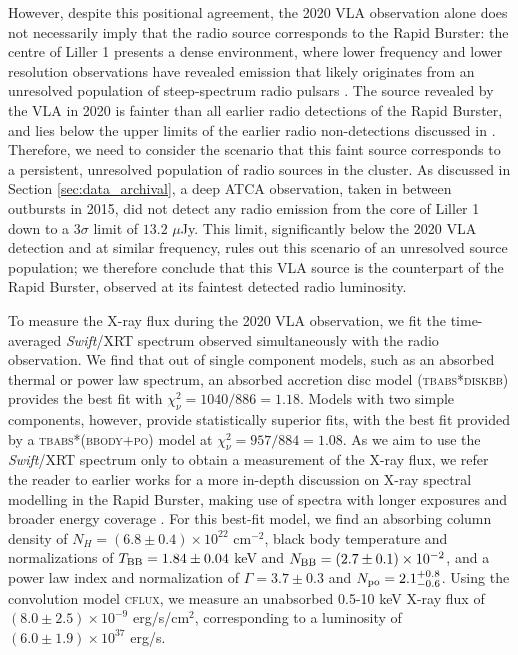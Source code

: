 \documentclass[fleqn,usenatbib]{mnras}
\begin{document}
However, despite this positional agreement, the 2020 VLA observation alone does not necessarily imply that the radio source corresponds to the Rapid Burster: the centre of Liller 1 presents a dense environment, where lower frequency and lower resolution observations have revealed emission that likely originates from an unresolved population of steep-spectrum radio pulsars \citep{fruchter1995}. The source revealed by the VLA in 2020 is fainter than all earlier radio detections of the Rapid Burster, and lies below the upper limits of the earlier radio non-detections discussed in \citet{moore2000}. Therefore, we need to consider the scenario that this faint source corresponds to a persistent, unresolved population of radio sources in the cluster. As discussed in Section \ref{sec:data_archival}, a deep ATCA observation, taken in between outbursts in 2015, did not detect any radio emission from the core of Liller 1 down to a $3\sigma$ limit of $13.2$ $\mu$Jy. This limit, significantly below the 2020 VLA detection and at similar frequency, rules out this scenario of an unresolved source population; we therefore conclude that this VLA source is the counterpart of the Rapid Burster, observed at its faintest detected radio luminosity.  

\label{sec:xrayanalysis} 
To measure the X-ray flux during the 2020 VLA observation, we fit the time-averaged \textit{Swift}/XRT spectrum observed simultaneously with the radio observation. We find that out of single component models, such as an absorbed thermal or power law spectrum, an absorbed accretion disc model (\textsc{tbabs*diskbb}) provides the best fit with $\chi^2_\nu = 1040/886 = 1.18$. Models with two simple components, however, provide statistically superior fits, with the best fit provided by a \textsc{tbabs*(bbody+po)} model at $\chi^2_\nu = 957/884 = 1.08$. As we aim to use the \textit{Swift}/XRT spectrum only to obtain a measurement of the X-ray flux, we refer the reader to earlier works for a more in-depth discussion on X-ray spectral modelling in the Rapid Burster, making use of spectra with longer exposures and broader energy coverage \citep[see e.g.][and references therein]{vandeneijnden2017}. For this best-fit model, we find an absorbing column density of $N_H = (6.8\pm0.4)\times10^{22}$ cm$^{-2}$, black body temperature and normalizations of $T_{\rm BB} = 1.84\pm0.04$ keV and $N_{\rm BB} = (2.7\pm0.1)\times10^{-2}$, and a power law index and normalization of $\Gamma = 3.7 \pm 0.3$ and $N_{\rm po} = 2.1^{+0.8}_{-0.6}$. Using the convolution model \textsc{cflux}, we measure an unabsorbed 0.5-10 keV X-ray flux of $(8.0\pm2.5)\times10^{-9}$ erg/s/cm$^2$, corresponding to a luminosity of $(6.0 \pm 1.9)\times10^{37}$ erg/s. 
\end{document}
